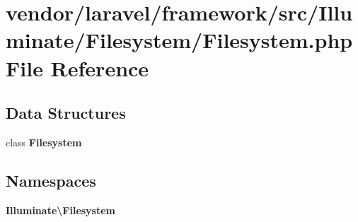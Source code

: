 \section{vendor/laravel/framework/src/\+Illuminate/\+Filesystem/\+Filesystem.php File Reference}
\label{laravel_2framework_2src_2_illuminate_2_filesystem_2_filesystem_8php}
\subsection*{Data Structures}
\begin{DoxyCompactItemize}
\item 
class {\bf Filesystem}
\end{DoxyCompactItemize}
\subsection*{Namespaces}
\begin{DoxyCompactItemize}
\item 
 {\bf Illuminate\textbackslash{}\+Filesystem}
\end{DoxyCompactItemize}
